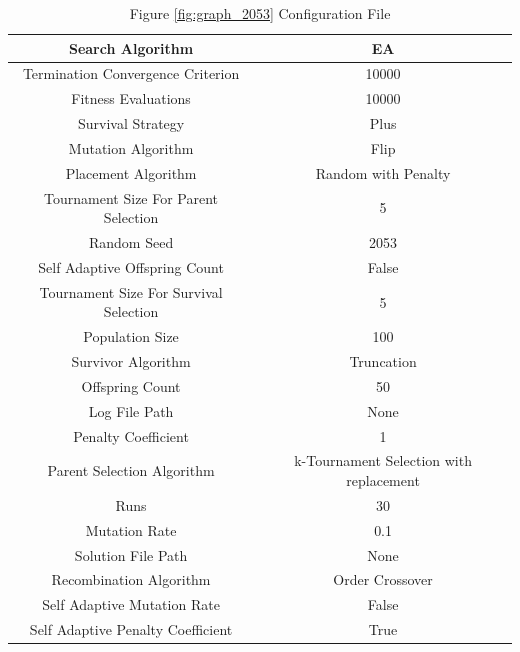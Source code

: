 \documentclass{standalone}
\begin{document}
\begin{table}[!htb]
	\centering
	\caption{Figure \ref{fig:graph_2053} Configuration File}
	\label{tab:graph_2053}
	\begin{tabular}{| c | c |}
		\hline
		Search Algorithm		& EA		 \\
		\hline
		Termination Convergence Criterion		& 10000		 \\
		\hline
		Fitness Evaluations		& 10000		 \\
		\hline
		Survival Strategy		& Plus		 \\
		\hline
		Mutation Algorithm		& Flip		 \\
		\hline
		Placement Algorithm		& Random with Penalty		 \\
		\hline
		Tournament Size For Parent Selection		& 5		 \\
		\hline
		Random Seed		& 2053		 \\
		\hline
		Self Adaptive Offspring Count		& False		 \\
		\hline
		Tournament Size For Survival Selection		& 5		 \\
		\hline
		Population Size		& 100		 \\
		\hline
		Survivor Algorithm		& Truncation		 \\
		\hline
		Offspring Count		& 50		 \\
		\hline
		Log File Path		& None		 \\
		\hline
		Penalty Coefficient		& 1		 \\
		\hline
		Parent Selection Algorithm		& k-Tournament Selection with replacement		 \\
		\hline
		Runs		& 30		 \\
		\hline
		Mutation Rate		& 0.1		 \\
		\hline
		Solution File Path		& None		 \\
		\hline
		Recombination Algorithm		& Order Crossover		 \\
		\hline
		Self Adaptive Mutation Rate		& False		 \\
		\hline
		Self Adaptive Penalty Coefficient		& True		 \\
		\hline
	\end{tabular}
\end{table}
\end{document}

